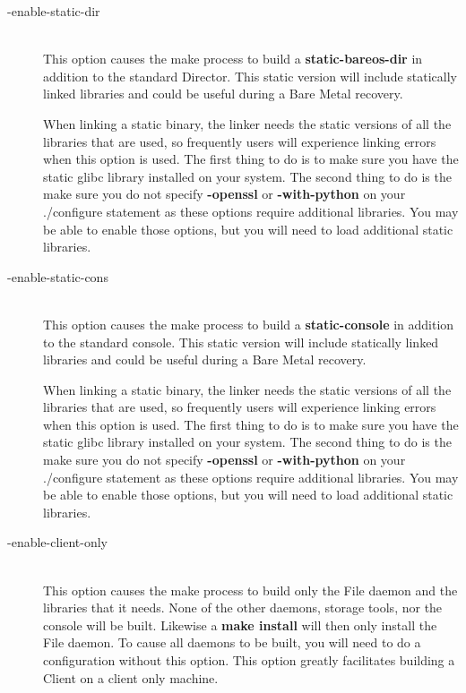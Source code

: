 \begin{description}
\item [ {-}{\-}enable-static-dir] \hfill \\
This option causes the make process to build a {\bf static-bareos-dir}
in addition to the standard Director.  This static version will include
statically linked libraries and could be useful during a Bare Metal
recovery.

When linking a static binary, the linker needs the static versions
of all the libraries that are used, so frequently users will
experience linking errors when this option is used. The first
thing to do is to make sure you have the static glibc library
installed on your system. The second thing to do is the make sure
you do not specify {\bf {-}{\-}openssl} or {\bf {-}{\-}with-python}
on your ./configure statement as these options require additional
libraries. You may be able to enable those options, but you will
need to load additional static libraries.

\item [ {-}{\-}enable-static-cons] \hfill \\
This option causes the make process to build a {\bf static-console} in
addition to the standard console.  This static version will include
statically linked libraries and could be useful during a Bare Metal
recovery.

When linking a static binary, the linker needs the static versions
of all the libraries that are used, so frequently users will
experience linking errors when this option is used. The first
thing to do is to make sure you have the static glibc library
installed on your system. The second thing to do is the make sure
you do not specify {\bf {-}{\-}openssl} or {\bf {-}{\-}with-python}
on your ./configure statement as these options require additional
libraries. You may be able to enable those options, but you will
need to load additional static libraries.

\item [ {-}{\-}enable-client-only] \hfill \\
This option causes the make process to build only the File daemon and
the libraries that it needs.  None of the other daemons, storage tools,
nor the console will be built.  Likewise a {\bf make install} will then
only install the File daemon.  To cause all daemons to be built, you
will need to do a configuration without this option.  This option
greatly facilitates building a Client on a client only machine.


\end{description}
